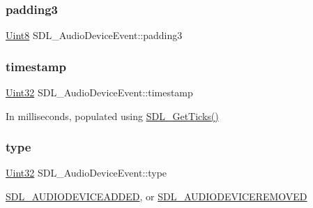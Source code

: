 \subsubsection{\texorpdfstring{padding3}{padding3}}
{\footnotesize\ttfamily \hyperlink{_s_d_l__stdinc_8h_a2944638813a090aa23e62f4da842c3e2}{Uint8} S\+D\+L\+\_\+\+Audio\+Device\+Event\+::padding3}

\mbox{\label{struct_s_d_l___audio_device_event_aa471680486a6103eafc9af569016df57}} 
\subsubsection{\texorpdfstring{timestamp}{timestamp}}
{\footnotesize\ttfamily \hyperlink{_s_d_l__stdinc_8h_add440eff171ea5f55cb00c4a9ab8672d}{Uint32} S\+D\+L\+\_\+\+Audio\+Device\+Event\+::timestamp}

In milliseconds, populated using \hyperlink{_s_d_l__timer_8h_a0b9bc71d6287e0ffafdc3419760fe2b3}{S\+D\+L\+\_\+\+Get\+Ticks()} \mbox{\label{struct_s_d_l___audio_device_event_ae68c3bd49b49608711a17395c7cbfe58}} 
\subsubsection{\texorpdfstring{type}{type}}
{\footnotesize\ttfamily \hyperlink{_s_d_l__stdinc_8h_add440eff171ea5f55cb00c4a9ab8672d}{Uint32} S\+D\+L\+\_\+\+Audio\+Device\+Event\+::type}

\hyperlink{_s_d_l__events_8h_a3b589e89be6b35c02e0dd34a55f3fccaadb3154654baf003910e75d74b507a82b}{S\+D\+L\+\_\+\+A\+U\+D\+I\+O\+D\+E\+V\+I\+C\+E\+A\+D\+D\+ED}, or \hyperlink{_s_d_l__events_8h_a3b589e89be6b35c02e0dd34a55f3fccaad56f8934fe24ee4c0cd9329e3c57c0c2}{S\+D\+L\+\_\+\+A\+U\+D\+I\+O\+D\+E\+V\+I\+C\+E\+R\+E\+M\+O\+V\+ED} \mbox{\label{struct_s_d_l___audio_device_event_ac91d70fd4e1dd596185fed061388896c}} 
